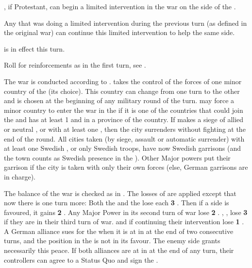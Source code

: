 \aparag \FRA, if Protestant, can begin a limited intervention in the war on
the side of the \alliance.

\aparag Any \MAJ that was doing a limited intervention during the previous
turn (as defined in the original war) can continue this limited intervention
to help the same side.

\aparag {} is in effect this turn.

\phadm
\aparag Roll for reinforcements as in the first turn, see
.

\phmil
\aparag The war is conducted according to .
\aparag \SUE takes the control of the forces of one minor country of the
\alliance (its choice). This country can change from one turn to the other and
is chosen at the beginning of any military round of the turn.
\aparag \SUE may force a minor country to enter the war in the \alliance if it
is one of the countries that could join the \alliance and \SUE has at least 1
\ARMY\faceplus and  in a province of the country.
\aparag If \SUE makes a siege of allied or neutral \provinceMecklenburg,
 or  with at least one \ARMY
\faceplus, then the city surrenders without fighting at the end of the round.
\aparag All cities taken (by siege, assault or automatic surrender) with at
least one Swedish \ARMY, or only Swedish troops, have now Swedish garrisons
(and the town counts as Swedish presence in the \HRE).  Other Major powers put
their garrison if the city is taken with only their own forces (else, German
garrisons are in charge).

\phpaix
\aparag The balance of the war is checked as in .  The losses of \STAB are applied except that now there is one turn
more:
\bparag Both the \alliance and the \ligue lose each {\bf 3} \STAB.
\bparag Then if a side is favoured, it gains {\bf 2} \STAB.
\bparag Any Major Power in its second turn of war lose {\bf 2} \STAB.
\bparag \SPA, \HOL, \AUS lose {\bf 3} \STAB if they are in their third turn of
war.
\bparag \SUE and \ENG if continuing their intervention lose {\bf 1} \STAB.
\label{pIV:TYW:Suing turn 2}
\bparag A German alliance sues for the  when it
is at  in \STAB at the end of two consecutive turns, and the
position in the \HRE is not in its favour. The enemy side grants necessarily
this peace.
\bparag If both alliances are at  in \STAB at the end of any turn,
their controllers can agree to a Status Quo and sign the
.

